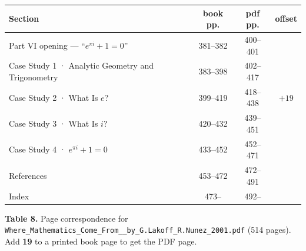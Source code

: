 \begin{center}\small
\begin{tabular}{@{}>{\raggedright\arraybackslash}p{7.6cm} c c c@{}}
\toprule
\rowcolor{slate!14}
\textbf{Section} & \textbf{book pp.} & \textbf{pdf pp.} & \textbf{offset}\\
\midrule
Part VI opening --- ``$e^{\pi i}+1=0$''                        & 381--382 & 400--401 & \multirow{5}{*}{$+19$}\\
Case Study 1 · Analytic Geometry and Trigonometry               & 383--398 & 402--417 & \\
Case Study 2 · What Is $e$?                                     & 399--419 & 418--438 & \\
Case Study 3 · What Is $i$?                                     & 420--432 & 439--451 & \\
Case Study 4 · $e^{\pi i}+1=0$                                  & 433--452 & 452--471 & \\
\midrule
References                                                      & 453--472 & 472--491 & \\
Index                                                           & 473--     & 492--    & \\
\bottomrule
\end{tabular}
\end{center}
\vspace{-2pt}
\begin{center}\begin{minipage}{0.93\textwidth}\footnotesize\color{slate}
\textbf{Table 8.}\; Page correspondence for
\texttt{Where\_Mathematics\_Come\_From\_\_by\_G.Lakoff\_R.Nunez\_2001.pdf} (514 pages).
Add \textbf{19} to a printed book page to get the PDF page.
\end{minipage}\end{center}

\vspace{22pt}
\begin{center}
\end{center}
\vspace{10pt}
